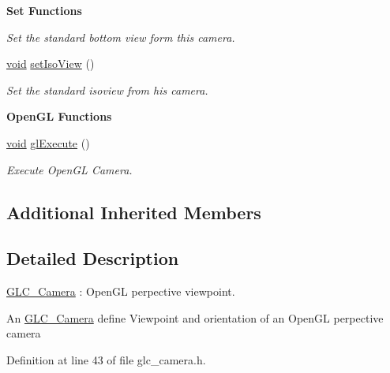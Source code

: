 \begin{Indent}{\bf Set Functions}
\begin{DoxyCompactItemize}
\begin{DoxyCompactList}\small\item\em Set the standard bottom view form this camera. \end{DoxyCompactList}\item 
\hyperlink{group___u_a_v_objects_plugin_ga444cf2ff3f0ecbe028adce838d373f5c}{void} \hyperlink{class_g_l_c___camera_a5d1f688e1782b6b0e7dc54e1438d3f7b}{set\-Iso\-View} ()
\begin{DoxyCompactList}\small\item\em Set the standard isoview from his camera. \end{DoxyCompactList}\end{DoxyCompactItemize}
\end{Indent}
\begin{Indent}{\bf Open\-G\-L Functions}\par
\begin{DoxyCompactItemize}
\item 
\hyperlink{group___u_a_v_objects_plugin_ga444cf2ff3f0ecbe028adce838d373f5c}{void} \hyperlink{class_g_l_c___camera_a5f294df986bdd4da5d05c17f5af7b8e8}{gl\-Execute} ()
\begin{DoxyCompactList}\small\item\em Execute Open\-G\-L Camera. \end{DoxyCompactList}\end{DoxyCompactItemize}
\end{Indent}
\subsection*{Additional Inherited Members}


\subsection{Detailed Description}
\hyperlink{class_g_l_c___camera}{G\-L\-C\-\_\-\-Camera} \-: Open\-G\-L perpective viewpoint. 

An \hyperlink{class_g_l_c___camera}{G\-L\-C\-\_\-\-Camera} define Viewpoint and orientation of an Open\-G\-L perpective camera 

Definition at line 43 of file glc\-\_\-camera.\-h.



